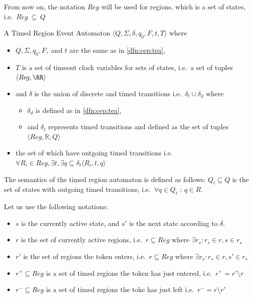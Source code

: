 		From now on, the notation $\mathit{Reg}$ will be used for regions, which is a set of states, i.e.~$\mathit{Reg}~\subseteq~Q$
		
		
		\begin{dfn}
			\label{dfn:cep:trea}
			A Timed Region Event Automaton $\langle Q,\Sigma,\delta,q_0, F, t, T \rangle$ where
			\begin{itemize}
				\item $Q, \Sigma, q_0, F,$ and  $t$ are the same as in \cref{dfn:cep:tea},
				\item $T$ is a set of timeout clock variables for sets of states, i.e.~a set of tuples $\langle \mathit{Reg}, \RR \rangle$
				\item and $\delta$ is the union of discrete and timed transitions i.e.~$\delta_t \cup \delta_d$ where
				\begin{itemize}
					\item $\delta_d$ is defined as in \cref{dfn:cep:tea},
					\item and $\delta_t$ represents timed transitions and defined as the set of tuples $\langle \mathit{Reg} , \mathbb{R} , Q \rangle$ 
				\end{itemize}
				\item  the set of which have outgoing timed transitions 
				i.e.~$ \forall R_i \in \mathit{Reg}, \exists t, \exists q  \subseteq \delta_t \langle R_i, t, q \rangle$ 
			\end{itemize}
		\end{dfn}
		
		The semantics of the timed region automaton is defined as follows:
		$Q_t \subseteq Q$ is the set of states with outgoing timed transitions, 
		i.e.~$\forall q \in Q_t$ : $ q \in R $. 
		
		
		Let us use the following notations: 
		
		\begin{itemize}
			\item $s$ is the currently active state, and $s'$ is the next state according to $\delta$.
			
			\item $r$ is the set of currently active regions, i.e.~$r \subseteq \mathit{Reg}$ where $\exists r_s : r_s \in r, s \in r_s $ 
			
			\item $r'$ is the set of regions the token enters, i.e.~$r \subseteq \mathit{Reg}$ where $\exists r_s :  r_s \in r, s' \in r_s $ 
			
			\item $r^+ \subseteq \mathit{Reg}$ is a set of timed regions the token has just entered, i.e.~$r^+ = r' \setminus r$ 
			
			\item $r^- \subseteq \mathit{Reg}$ is a set of timed regions the toke has just left i.e.~$r^- = r \setminus r'$
		\end{itemize}
		
